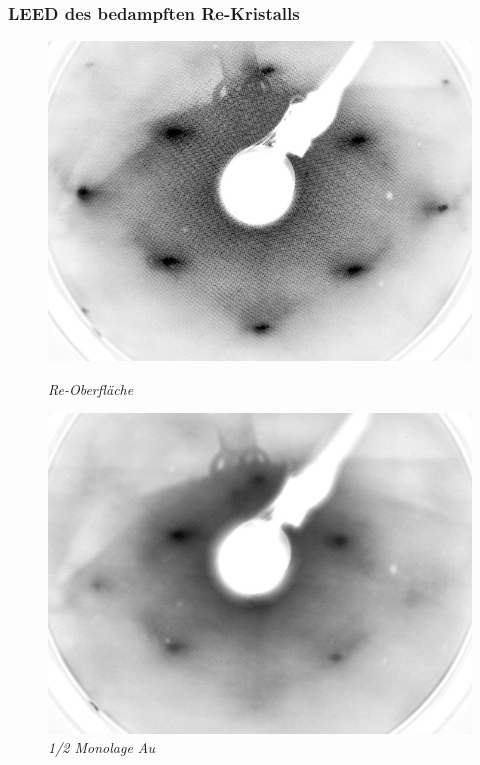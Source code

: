 \documentclass{beamer}
\begin{document}
\begin{frame}
\frametitle{LEED des bedampften Re-Kristalls}
\begin{minipage}{\linewidth}
\begin{figure}[H]
		\captionsetup{name=Abb.}
	\begin{minipage}[b]{0.3\textwidth} 
		\includegraphics[width=\textwidth]{bilder/unbedampft_E207}
		\caption*{\textit{Re-Oberfläche}}
	\end{minipage}
	\hfill
	\begin{minipage}[b]{0.3\textwidth}
		\includegraphics[width=\textwidth]{bilder/0_5ML_E208}
		\caption*{\textit{1/2 Monolage Au}} 
	\end{minipage}

\end{figure}
\end{minipage}
\end{frame}
\end{document}
